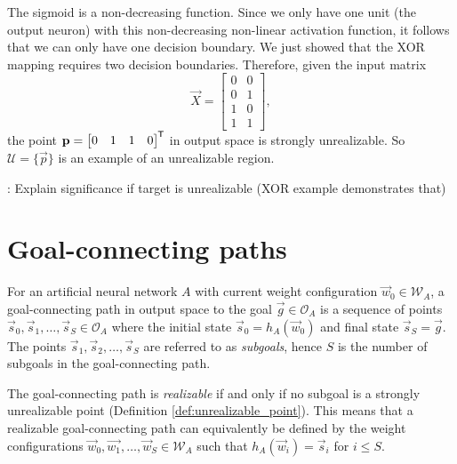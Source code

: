\begin{example}
    The sigmoid is a non-decreasing function.
    Since we only have one unit (the output neuron) with this non-decreasing non-linear activation function, it follows that we can only have one decision boundary.
    We just showed that the XOR mapping requires two decision boundaries.
    Therefore, given the input matrix
    \begin{equation*}
        \vec{X} = \begin{bmatrix}
            0 & 0 \\
            0 & 1 \\
            1 & 0 \\
            1 & 1
        \end{bmatrix},
    \end{equation*}
    the point
    $
        \mathbf{p} = \begin{bmatrix}
            0 & 1 & 1 & 0
        \end{bmatrix}^{\mkern-1.5mu\mathsf{T}}
    $
    in output space is strongly unrealizable.
    So $\mathcal{U} = \{\vec{p}\}$ is an example of an unrealizable region.    
\end{example}





\todo: Explain significance if target is unrealizable (XOR example demonstrates that)

\section{Goal-connecting paths}
\begin{definition}
    For an artificial neural network $A$ with current weight configuration $\vec{w}_0 \in \mathcal{W}_A$, a goal-connecting path in output space to the goal $\vec{g}\in \mathcal{O}_A$ is a sequence of points $\vec{s}_0, \vec{s}_1,\dots,\vec{s}_{S} \in \mathcal{O}_A$ where the initial state $\vec{s}_0 = h_A(\vec{w}_0)$ and final state $\vec{s}_S=\vec{g}$.
    The points $\vec{s}_1,\vec{s}_2,\dots,\vec{s}_S$ are referred to as \textit{subgoals}, hence $S$ is the number of subgoals in the goal-connecting path. 

    The goal-connecting path is \textit{realizable} if and only if no subgoal is a strongly unrealizable point (Definition \ref{def:unrealizable_point}).
    This means that a realizable goal-connecting path can equivalently be defined by the weight configurations $\vec{w}_0, \vec{w_1},\dots,\vec{w}_S \in \mathcal{W}_A$ such that $h_A(\vec{w}_i) = \vec{s}_i$ for $i \leq S$.
\end{definition}

